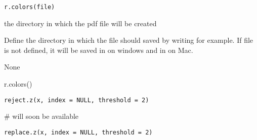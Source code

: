 \documentclass[a4paper]{book}
\begin{document}
%
\begin{Usage}
\begin{verbatim}
r.colors(file)
\end{verbatim}
\end{Usage}
%
\begin{Arguments}
\begin{ldescription}
\item[\code{file}] 
the directory in which the pdf file will be created


\end{ldescription}
\end{Arguments}
%
\begin{Details}\relax
Define the directory in which the file should saved by writing  for example.
If file is not defined, it will be saved in  on windows and in  on Mac.
\end{Details}
%
\begin{Value}
None
\end{Value}
%
\begin{Examples}
\begin{ExampleCode}
r.colors()
\end{ExampleCode}
\end{Examples}
\newpage
{}
%
\begin{Usage}
\begin{verbatim}
reject.z(x, index = NULL, threshold = 2)
\end{verbatim}
\end{Usage}
%
\begin{Arguments}
\begin{ldescription}
\item[\code{x}] 


\item[\code{index}] 


\item[\code{threshold}] 


\end{ldescription}
\end{Arguments}
%
\begin{Examples}
\begin{ExampleCode}
# will soon be available
\end{ExampleCode}
\end{Examples}
\newpage
{}
%
\begin{Usage}
\begin{verbatim}
replace.z(x, index = NULL, threshold = 2)
\end{verbatim}
\end{Usage}
\end{document}
